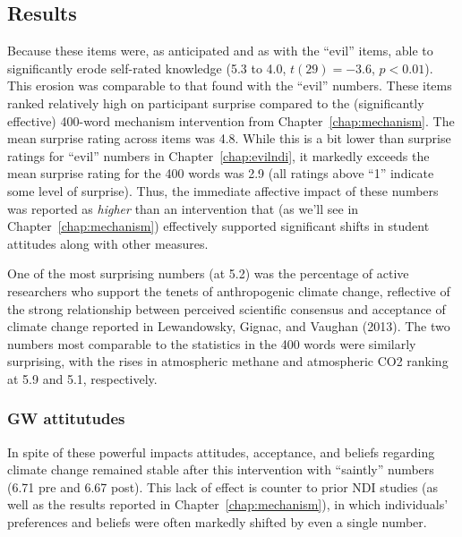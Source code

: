% 

\subsection{Results}

Because these items were, as anticipated and as with the “evil” items, able to
significantly erode self-rated knowledge (5.3 to 4.0, $t(29)=-3.6$, $p<0.01$).
This erosion was comparable to that found with the “evil” numbers.  These items
ranked relatively high on participant surprise compared to the (significantly
effective) 400-word mechanism intervention from Chapter~\ref{chap:mechanism}.
The mean surprise rating across items was 4.8.  While this is a bit lower than
surprise ratings for “evil” numbers in Chapter~\ref{chap:evilndi}, it markedly
exceeds the mean surprise rating for the 400 words was 2.9 (all ratings above
“1” indicate some level of surprise). Thus, the immediate affective impact of
these numbers was reported as \emph{higher} than an intervention that (as we'll
see in Chapter~\ref{chap:mechanism}) effectively supported significant shifts in
student attitudes along with other measures.

One of the most surprising numbers (at 5.2) was the percentage of active
researchers who support the tenets of anthropogenic climate change, reflective
of the strong relationship between perceived scientific consensus and acceptance
of climate change reported in Lewandowsky, Gignac, and Vaughan (2013). The two
numbers most comparable to the statistics in the 400 words were similarly
surprising, with the rises in atmospheric methane and atmospheric CO2 ranking at
5.9 and 5.1, respectively.


\subsubsection{GW attitutudes}

In spite of these powerful impacts attitudes, acceptance, and beliefs regarding
climate change remained stable after this intervention with “saintly” numbers
(6.71 pre and 6.67 post).  This lack of effect is counter to prior NDI studies
(as well as the results reported in Chapter~\ref{chap:mechanism}), in which
individuals’ preferences and beliefs were often markedly shifted by even a
single number. 

